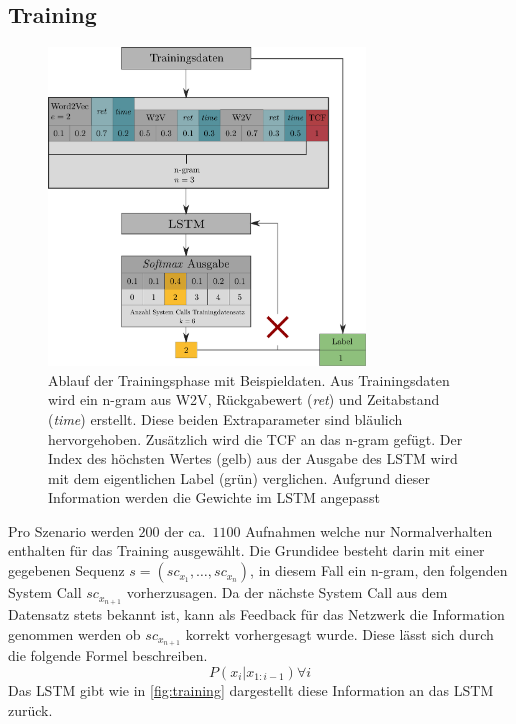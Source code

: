         \subsection{Training}\label{sec:Training}
            \begin{figure}
                \centering
                \includegraphics[width=0.75\textwidth]{images/Process_overview.pdf}
                \caption{Ablauf der Trainingsphase mit Beispieldaten.
                        Aus Trainingsdaten wird ein n-gram aus \ac{W2V}, Rückgabewert (\textit{ret}) und Zeitabstand (\textit{time}) erstellt.
                        Diese beiden Extraparameter sind bläulich hervorgehoben.
                        Zusätzlich wird die \ac{TCF} an das n-gram gefügt.
                        Der Index des höchsten Wertes (gelb) aus der Ausgabe des \ac{LSTM} wird mit dem eigentlichen Label (grün) verglichen.
                        Aufgrund dieser Information werden die Gewichte im \ac{LSTM} angepasst}
                        \label{fig:training}
            \end{figure}
            Pro Szenario werden $200$ der ca.\ $1100$ Aufnahmen welche nur Normalverhalten enthalten für das Training ausgewählt.
            Die Grundidee besteht darin mit einer gegebenen Sequenz $s = (sc_{x_1},\dots,sc_{x_n})$, in diesem Fall ein n-gram, den folgenden System Call $sc_{x_{n+1}}$ vorherzusagen. 
            Da der nächste System Call aus dem Datensatz stets bekannt ist, kann als Feedback für das Netzwerk die Information genommen werden ob $sc_{x_{n+1}}$ korrekt vorhergesagt wurde.
            Diese lässt sich durch die folgende Formel beschreiben.
            \begin{equation}
                P\left(x_i|x_{1:i-1}\right) \forall i
            \end{equation}
            Das \ac{LSTM} gibt wie in \autoref{fig:training} dargestellt diese Information an das \ac{LSTM} zurück.


